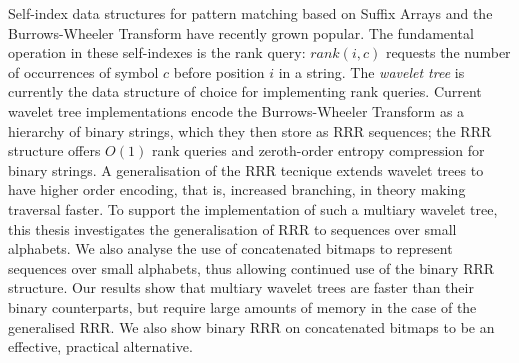 Self-index data structures for pattern matching based on Suffix
Arrays and the Burrows-Wheeler Transform have recently grown
popular. The fundamental operation in these self-indexes is the rank query: 
$rank(i, c)$ requests the number of occurrences of symbol $c$ before position 
$i$ in a string. The \emph{wavelet 
tree} is currently the data structure of choice for implementing rank 
queries. Current wavelet tree implementations encode the Burrows-Wheeler 
Transform as a hierarchy of binary strings, which they then store as RRR 
sequences;
the RRR structure offers $O(1)$ rank queries and zeroth-order entropy 
compression for 
binary strings. A generalisation of the RRR tecnique extends wavelet trees to 
have higher 
order encoding, that is, increased branching, in theory making traversal faster. 
To support the implementation of such a multiary
wavelet tree, this thesis investigates the generalisation of RRR to sequences 
over small alphabets. We also analyse the use of concatenated bitmaps to 
represent sequences over small alphabets, thus allowing continued use of the
binary RRR structure. Our results show that multiary wavelet trees are faster
than their binary counterparts, but require large amounts of memory in the 
case of the generalised RRR. We also show binary RRR on concatenated bitmaps to 
be an effective, practical alternative.